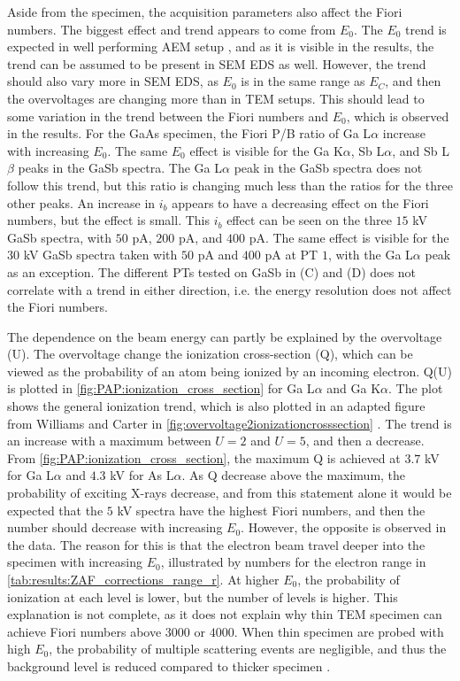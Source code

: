Aside from the specimen, the acquisition parameters also affect the Fiori numbers.
The biggest effect and trend appears to come from $E_0$.
The $E_0$ trend is expected in well performing AEM setup \cite{williams_carter_tem_2009}, and as it is visible in the results, the trend can be assumed to be present in SEM EDS as well.
However, the trend should also vary more in SEM EDS, as $E_0$ is in the same range as $E_C$, and then the overvoltages are changing more than in TEM setups.
This should lead to some variation in the trend between the Fiori numbers and $E_0$, which is observed in the results.
For the GaAs specimen, the Fiori P/B ratio of Ga L$\alpha$ increase with increasing $E_0$.
The same $E_0$ effect is visible for the Ga K$\alpha$, Sb L$\alpha$, and Sb L$\beta$ peaks in the GaSb spectra.
The Ga L$\alpha$ peak in the GaSb spectra does not follow this trend, but this ratio is changing much less than the ratios for the three other peaks.
An increase in $i_b$ appears to have a decreasing effect on the Fiori numbers, but the effect is small.
This $i_b$ effect can be seen on the three $15$ kV GaSb spectra, with $50$ pA, $200$ pA, and $400$ pA.
The same effect is visible for the $30$ kV GaSb spectra taken with $50$ pA and $400$ pA at PT $1$, with the Ga L$\alpha$ peak as an exception.
The different PTs tested on GaSb in (C) and (D) does not correlate with a trend in either direction, i.e. the energy resolution does not affect the Fiori numbers.


The dependence on the beam energy can partly be explained by the overvoltage (U).
The overvoltage change the ionization cross-section (Q), which can be viewed as the probability of an atom being ionized by an incoming electron.
Q(U) is plotted in \cref{fig:PAP:ionization_cross_section} for Ga L$\alpha$ and Ga K$\alpha$.
The plot shows the general ionization trend, which is also plotted in an adapted figure from Williams and Carter in \cref{fig:overvoltage2ionizationcrosssection} \cite{williams_carter_tem_2009}.
The trend is an increase with a maximum between $U=2$ and $U=5$, and then a decrease.
From \cref{fig:PAP:ionization_cross_section}, the maximum Q is achieved at $3.7$ kV for Ga L$\alpha$ and $4.3$ kV for As L$\alpha$.
As Q decrease above the maximum, the probability of exciting X-rays decrease, and from this statement alone it would be expected that the $5$ kV spectra have the highest Fiori numbers, and then the number should decrease with increasing $E_0$.
However, the opposite is observed in the data.
The reason for this is that the electron beam travel deeper into the specimen with increasing $E_0$, illustrated by numbers for the electron range in \cref{tab:results:ZAF_corrections_range_r}.
At higher $E_0$, the probability of ionization at each level is lower, but the number of levels is higher.
This explanation is not complete, as it does not explain why thin TEM specimen can achieve Fiori numbers above $3000$ or $4000$.
When thin specimen are probed with high $E_0$, the probability of multiple scattering events are negligible, and thus the background level is reduced compared to thicker specimen \cite{liao2006practical}.



